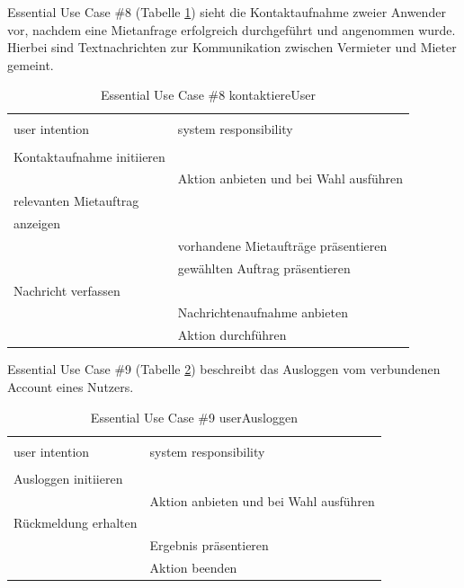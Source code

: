 \newpage
Essential Use Case \#8 (Tabelle \ref{tab:kontaktaufnahme}) sieht die Kontaktaufnahme zweier Anwender vor, nachdem eine Mietanfrage erfolgreich durchgeführt und angenommen wurde. Hierbei sind Textnachrichten zur Kommunikation zwischen Vermieter und Mieter gemeint.
\begin{table}[H]
\caption{Essential Use Case \#8 kontaktiereUser }
\centering
\begin{tabular}{l l}
\\ [-0.5ex]

\hline\hline
\\ [-0.5ex]
user intention & system responsibility
\\ [1.5ex]
\hline
\\ [-0.5ex]
Kontaktaufnahme initiieren &                                 \\[1ex]
                     & Aktion anbieten und bei Wahl ausführen   \\[1ex]
relevanten Mietauftrag     &                                 \\[1ex] 
anzeigen             &                                 \\[1ex] 
                     & vorhandene Mietaufträge präsentieren        \\[1ex]
                     & gewählten Auftrag präsentieren        \\[1ex]
Nachricht verfassen        &                                 \\[1ex]
                     & Nachrichtenaufnahme anbieten             \\[1ex]
                     & Aktion durchführen                 \\[1ex]
\hline
\end{tabular}
\label{tab:kontaktaufnahme}
\end{table}


\newpage
Essential Use Case \#9 (Tabelle \ref{tab:ausloggen}) beschreibt das Ausloggen vom verbundenen Account eines Nutzers.
\begin{table}[H]
\caption{Essential Use Case \#9 userAusloggen }
\centering
\begin{tabular}{l l}
\\ [-0.5ex]

\hline\hline
\\ [-0.5ex]
user intention & system responsibility
\\ [1.5ex]
\hline
\\ [-0.5ex]
Ausloggen initiieren    &                                 \\[1ex]
                     & Aktion anbieten und bei Wahl ausführen   \\[1ex]
Rückmeldung erhalten    &                                 \\[1ex]
                     & Ergebnis präsentieren                 \\[1ex]
                     & Aktion beenden                     \\[1ex]

\hline
\end{tabular}
\label{tab:ausloggen}
\end{table}



